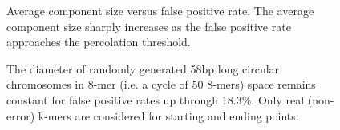 \documentclass{pnastwo}
\begin{document}
\begin{figure}
\caption{Average component size versus false positive rate. The average 
component size sharply increases as the false positive 
rate approaches the percolation threshold.
}
\label{fig:clustersize}
\end{figure}

\begin{figure}

\caption{The diameter of randomly generated 58bp long circular
  chromosomes in 8-mer (i.e. a cycle of 50 8-mers) space remains 
constant for false
  positive rates up through 18.3\%. Only real (non-error) k-mers are considered for
  starting and ending points.}
\label{fig:diam}
\end{figure}
\end{document}
